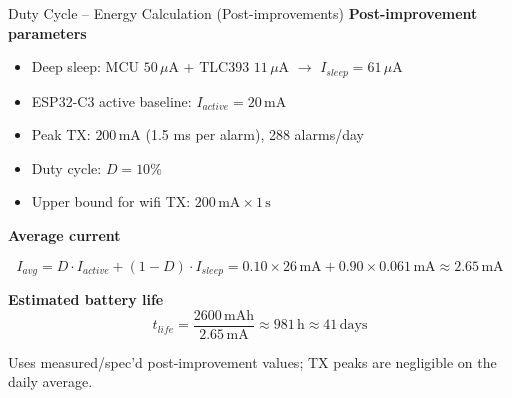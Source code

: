 \begin{frame}{Duty Cycle -- Energy Calculation (Post-improvements)}
  \textbf{Post-improvement parameters}
  \begin{itemize}
    \item Deep sleep: MCU $50\,\mu\text{A}$ + TLC393 $11\,\mu\text{A}$ $\rightarrow$ $I_{sleep}=61\,\mu\text{A}$
    \item ESP32-C3 active baseline: $I_{active}=20\,\text{mA}$
    \item Peak TX: $200\,\text{mA}$ (1.5 ms per alarm), 288 alarms/day
    \item Duty cycle: $D=10\%$
    \item Upper bound for wifi TX: $200\,\text{mA} \times 1\,\text{s}$
  \end{itemize}

  \vspace{0.5em}
  \textbf{Average current}
  
  \[
    I_{avg} = D\cdot I_{active} + (1-D)\cdot I_{sleep}
           = 0.10\times26\,\mathrm{mA} + 0.90\times0.061\,\mathrm{mA}
           \approx 2.65\,\mathrm{mA}
  \]

  \textbf{Estimated battery life}
  \[
    t_{life} = \frac{2600\,\mathrm{mAh}}{2.65\,\mathrm{mA}} \approx 981\,\mathrm{h} \approx 41\,\mathrm{days}
  \]

  \vspace{0.5em}
  \scriptsize Uses measured/spec'd post-improvement values; TX peaks are negligible on the daily average.
\end{frame}
